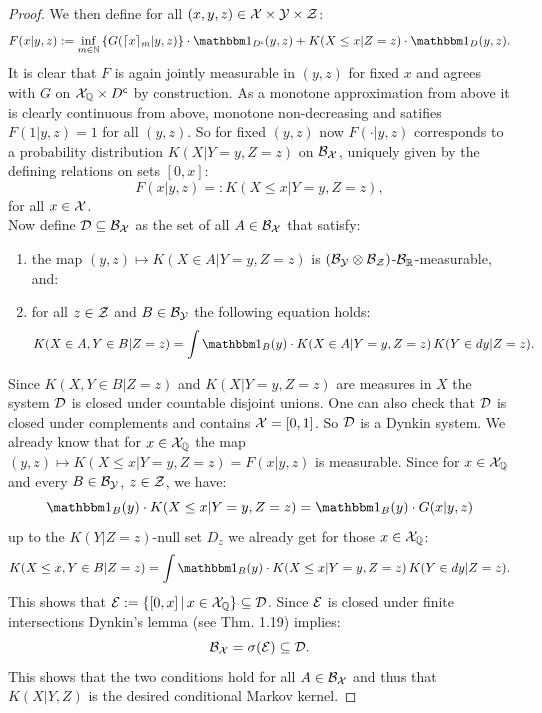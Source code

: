 \begin{Thm}
\begin{proof}
We then define for all $(x,y,z) \in \mathcal{X} \times \mathcal{Y} \times \mathcal{Z}$: 
\[ F(x|y,z) := \inf_{m \in \N} \left \{ G(\lceil x\rceil_m|y,z)\right\} \cdot \I_{D^\cmpl}(y,z) +  K(X \le x|Z=z) \cdot \I_D(y,z). \]
It is clear that $F$ is again jointly measurable in $(y,z)$ for fixed $x$ and agrees with $G$  on $\mathcal{X}_{\mathbb{Q}} \times D^{\mathsf{c}}$ by construction.
As a monotone approximation from above it is clearly continuous from above, monotone non-decreasing and satifies $F(1|y,z)=1$ for all $(y,z)$.
So for fixed $(y,z)$ now $F(\cdot|y,z)$ corresponds to a probability distribution $ K(X|Y=y,Z=z)$ on $\mathcal{B}_{\mathcal{X}}$, uniquely given by the defining relations on sets $[0,x]$:
\[ F(x|y,z) =:  K(X \le x|Y=y,Z=z),\]
for all $x \in \mathcal{X}$. \\
Now define $\mathcal{D} \subseteq \mathcal{B}_{\mathcal{X}}$ as the set of all $A \in \mathcal{B}_{\mathcal{X}}$ that satisfy:
\begin{enumerate}
    \item the map $(y,z) \mapsto  K(X \in A|Y=y,Z=z)$ is $(\mathcal{B}_{\mathcal{Y}}\otimes\mathcal{B}_{\mathcal{Z}})$-$\mathcal{B}_{\mathbb{R}}$-measurable, and:
    \item for all $z \in \mathcal{Z}$ and $B \in \mathcal{B}_{\mathcal{Y}}$ the following equation holds:
        \[  K(X \in A, Y \in B |Z=z) = \int \I_B(y) \cdot  K(X \in A | Y=y,Z=z) \,  K(Y \in dy | Z=z). \]
\end{enumerate}
Since $ K(X,Y \in B|Z=z)$ and $ K(X|Y=y,Z=z)$ are measures in $X$ the system $\mathcal{D}$ is closed under countable disjoint unions. One can also check that $\mathcal{D}$ is closed under
complements and contains $\mathcal{X}=[0,1]$. So $\mathcal{D}$ is a Dynkin system.
We already know that for $x \in \mathcal{X}_{\mathbb{Q}}$ the map $(y,z) \mapsto  K(X \le x|Y=y,Z=z)=F(x|y,z)$ is measurable.
Since for $x \in \mathcal{X}_{\mathbb{Q}}$ and every $B \in \mathcal{B}_{\mathcal{Y}}$, $z \in \mathcal{Z}$, we have:
\[ \I_B(y) \cdot  K(X \le x | Y=y,Z=z) = \I_B(y) \cdot G(x|y,z) \]
up to the $ K(Y|Z=z)$-null set $D_z$ we already get for those $x \in \mathcal{X}_{\mathbb{Q}}$:
\[  K(X \le x, Y \in B |Z=z) = \int \I_B(y) \cdot  K(X \le x | Y=y,Z=z) \,  K(Y \in dy | Z=z). \]
This shows that $\mathcal{E}:=\{ [0,x] \,|\, x \in \mathcal{X}_{\mathbb{Q}}\} \subseteq \mathcal{D}$. Since $\mathcal{E}$ is closed under finite intersections 
Dynkin's lemma (see \cite{Kle20} Thm. 1.19) implies: 
\[\mathcal{B}_{\mathcal{X}}=\sigma(\mathcal{E}) \subseteq \mathcal{D}.\]
This shows that the two conditions hold for all $A \in \mathcal{B}_{\mathcal{X}}$ and thus that $ K(X|Y,Z)$ is the desired conditional Markov kernel.
\end{proof}
\end{Thm}


